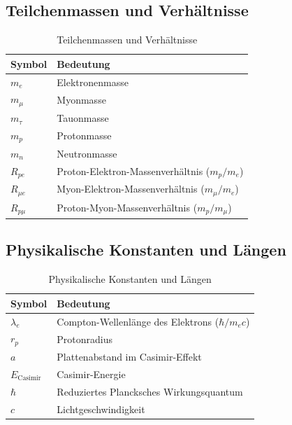 	\subsection{Teilchenmassen und Verhältnisse}
	
	\begin{table}[htbp]
		\centering
		\begin{tabular}{p{3cm}p{9cm}}
			\toprule
			\textbf{Symbol} & \textbf{Bedeutung} \\
			\midrule
			$m_e$ & Elektronenmasse \\
			$m_{\mu}$ & Myonmasse \\
			$m_{\tau}$ & Tauonmasse \\
			$m_p$ & Protonmasse \\
			$m_n$ & Neutronmasse \\
			$R_{pe}$ & Proton-Elektron-Massenverhältnis ($m_p/m_e$) \\
			$R_{\mu e}$ & Myon-Elektron-Massenverhältnis ($m_{\mu}/m_e$) \\
			$R_{p\mu}$ & Proton-Myon-Massenverhältnis ($m_p/m_{\mu}$) \\
			\bottomrule
		\end{tabular}
		\caption{Teilchenmassen und Verhältnisse}
	\end{table}
	
	\subsection{Physikalische Konstanten und Längen}
	
	\begin{table}[htbp]
		\centering
		\begin{tabular}{p{3cm}p{9cm}}
			\toprule
			\textbf{Symbol} & \textbf{Bedeutung} \\
			\midrule
			$\lambda_e$ & Compton-Wellenlänge des Elektrons ($\hbar/m_e c$) \\
			$r_p$ & Protonradius \\
			$a$ & Plattenabstand im Casimir-Effekt \\
			$E_{\text{Casimir}}$ & Casimir-Energie \\
			$\hbar$ & Reduziertes Plancksches Wirkungsquantum \\
			$c$ & Lichtgeschwindigkeit \\
			\bottomrule
		\end{tabular}
		\caption{Physikalische Konstanten und Längen}
	\end{table}
	
